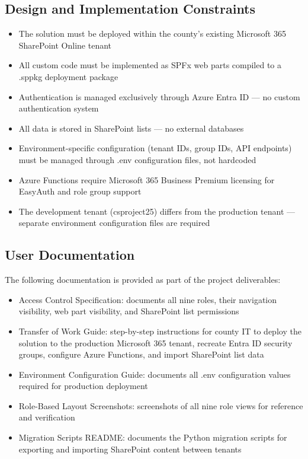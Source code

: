 \documentclass[12pt]{article}
\begin{document}
\subsection{Design and Implementation Constraints}

\begin{itemize}[leftmargin=*]
\item  The solution must be deployed within the county's existing Microsoft 365 SharePoint Online tenant
\item  All custom code must be implemented as SPFx web parts compiled to a .sppkg deployment package
\item  Authentication is managed exclusively through Azure Entra ID --- no custom authentication system
\item  All data is stored in SharePoint lists --- no external databases
\item  Environment-specific configuration (tenant IDs, group IDs, API endpoints) must be managed through .env configuration files, not hardcoded
\item  Azure Functions require Microsoft 365 Business Premium licensing for EasyAuth and role group support
\item  The development tenant (csproject25) differs from the production tenant --- separate environment configuration files are required
\end{itemize}

\subsection{User Documentation}

The following documentation is provided as part of the project deliverables:

\begin{itemize}[leftmargin=*]
\item  Access Control Specification: documents all nine roles, their navigation visibility, web part visibility, and SharePoint list permissions
\item  Transfer of Work Guide: step-by-step instructions for county IT to deploy the solution to the production Microsoft 365 tenant, recreate Entra ID security groups, configure Azure Functions, and import SharePoint list data
\end{itemize}

\begin{itemize}[leftmargin=*]
\item  Environment Configuration Guide: documents all .env configuration values required for production deployment
\item  Role-Based Layout Screenshots: screenshots of all nine role views for reference and verification
\item  Migration Scripts README: documents the Python migration scripts for exporting and importing SharePoint content between tenants
\end{itemize}
\end{document}
